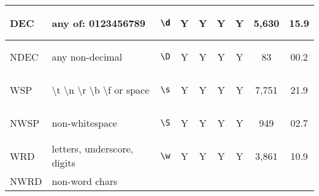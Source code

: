 %
%
\tablelasttail{%
\bottomrule}

\begin{xtabular}{lllcccccc}
DEC &  any of: 0123456789 &
\begin{minipage}{0.5in}\begin{verbatim}
\d
\end{verbatim}\end{minipage} & Y & Y & Y & Y & 5,630 & 15.9\\
\midrule
NDEC & any non-decimal &
\begin{minipage}{0.5in}\begin{verbatim}
\D
\end{verbatim}\end{minipage} & Y & Y & Y & Y & 83 & 00.2\\
\midrule
WSP &
\textbackslash t \textbackslash n \textbackslash r \textbackslash b \textbackslash f or space
&
\begin{minipage}{0.5in}\begin{verbatim}
\s
\end{verbatim}\end{minipage} & Y & Y & Y & Y & 7,751 & 21.9\\
\midrule
NWSP & non-whitespace &
\begin{minipage}{0.5in}\begin{verbatim}
\S
\end{verbatim}\end{minipage} & Y & Y & Y & Y & 949 & 02.7\\
\midrule
WRD & letters, underscore, digits &
\begin{minipage}{0.5in}\begin{verbatim}
\w
\end{verbatim}\end{minipage} & Y & Y & Y & Y & 3,861 & 10.9\\
\midrule
NWRD & non-word chars &

\end{xtabular}

